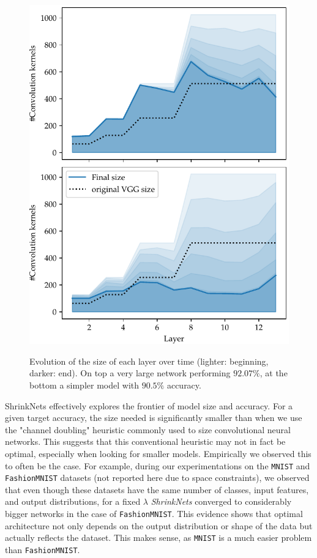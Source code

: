 \begin{figure}[htb]
\begin{center}
\includegraphics[width=.7\columnwidth]{size_evolution}
\vspace*{-5mm} 
\caption{ Evolution of the size of
  each layer over time (lighter: beginning, darker: end). On top a very large
  network performing $92.07\%$, at the bottom a simpler model with $90.5\%$
  accuracy. 
} 
\vspace*{-5mm} 
\label{fig:network_size_evolution}
\end{center}
\vspace*{-4mm}
\end{figure}

ShrinkNets effectively explores the frontier of model size and accuracy. For a
given target accuracy, the size needed is significantly smaller than when we use the
"channel doubling" heuristic commonly used to size convolutional neural networks.
This suggests that this conventional heuristic may not in fact be optimal,
especially when looking for smaller models.  Empirically we observed this to
often be the case.  For example, during our experimentations on the
\texttt{MNIST} \cite{Lecun1998} and \texttt{FashionMNIST} \cite{Xiao2017}
datasets (not reported here due to space constraints), we observed that even
though these datasets have the same number of classes, input features, and
output distributions, for a fixed $\lambda$ \textit{ShrinkNets} converged to
considerably bigger networks in the case of \texttt{FashionMNIST}. This evidence
shows that optimal architecture not only depends on the output distribution or
shape of the data but actually reflects the dataset.  This makes sense, as
\texttt{MNIST} is a much easier problem than \texttt{FashionMNIST}.

